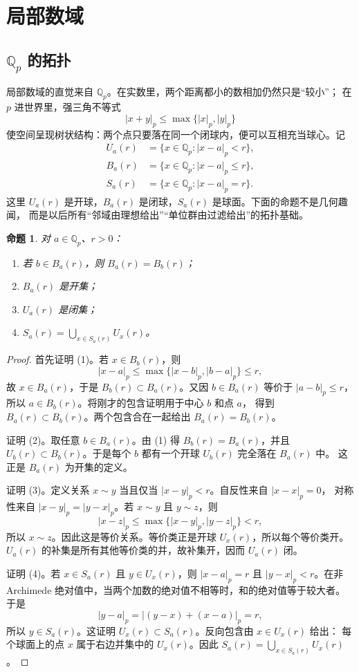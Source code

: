 \documentclass[11pt,a4paper,openany]{ctexbook}
\numberwithin{equation}{chapter}
\newcommand{\Q}{\mathbb{Q}}
\theoremstyle{plain}
\newtheorem{proposition}[theorem]{命题}
\theoremstyle{definition}
\theoremstyle{remark}
\begin{document}
\section{局部数域}

\subsection{\texorpdfstring{$\Q_p$}{Qp} 的拓扑}

局部数域的直觉来自 $\Q_p$。在实数里，两个距离都小的数相加仍然只是“较小”；
在 $p$ 进世界里，强三角不等式
\[
|x+ y|_p\le \max\{|x|_p,|y|_p\}
\]
使空间呈现树状结构：两个点只要落在同一个闭球内，便可以互相充当球心。记
\[
\begin{aligned}
U_a(r)&=\{x\in\Q_p:|x-a|_p<r\},\\
B_a(r)&=\{x\in\Q_p:|x-a|_p\le r\},\\
S_a(r)&=\{x\in\Q_p:|x-a|_p=r\}.
\end{aligned}
\]
这里 $U_a(r)$ 是开球，$B_a(r)$ 是闭球，$S_a(r)$ 是球面。下面的命题不是几何趣闻，
而是以后所有“邻域由理想给出”“单位群由过滤给出”的拓扑基础。

\begin{proposition}
对 $a\in\Q_p$、$r>0$：
\begin{enumerate}[label=(\arabic*)]
\item 若 $b\in B_a(r)$，则 $B_a(r)=B_b(r)$；
\item $B_a(r)$ 是开集；
\item $U_a(r)$ 是闭集；
\item $S_a(r)=\bigcup_{x\in S_a(r)}U_x(r)$。
\end{enumerate}
\end{proposition}

\begin{proof}
首先证明 (1)。若 $x\in B_b(r)$，则
\[
|x-a|_p\le\max\{|x-b|_p,|b-a|_p\}\le r,
\]
故 $x\in B_a(r)$，于是 $B_b(r)\subset B_a(r)$。又因 $b\in B_a(r)$ 等价于
 $|a-b|_p\le r$，所以 $a\in B_b(r)$。将刚才的包含证明用于中心 $b$ 和点 $a$，
得到 $B_a(r)\subset B_b(r)$。两个包含合在一起给出 $B_a(r)=B_b(r)$。

证明 (2)。取任意 $b\in B_a(r)$。由 (1) 得 $B_b(r)=B_a(r)$，并且
$U_b(r)\subset B_b(r)$。于是每个 $b$ 都有一个开球 $U_b(r)$ 完全落在 $B_a(r)$ 中。
这正是 $B_a(r)$ 为开集的定义。

证明 (3)。定义关系 $x\sim y$ 当且仅当 $|x-y|_p<r$。自反性来自 $|x-x|_p=0$，
对称性来自 $|x-y|_p=|y-x|_p$。若 $x\sim y$ 且 $y\sim z$，则
\[
|x-z|_p\le \max\{|x-y|_p,|y-z|_p\}<r,
\]
所以 $x\sim z$。因此这是等价关系。等价类正是开球 $U_x(r)$，所以每个等价类开。
$U_a(r)$ 的补集是所有其他等价类的并，故补集开，因而 $U_a(r)$ 闭。

证明 (4)。若 $x\in S_a(r)$ 且 $y\in U_x(r)$，则 $|x-a|_p=r$ 且 $|y-x|_p<r$。在非
Archimede 绝对值中，当两个加数的绝对值不相等时，和的绝对值等于较大者。于是
\[
|y-a|_p=|(y-x)+(x-a)|_p=r,
\]
所以 $y\in S_a(r)$。这证明 $U_x(r)\subset S_a(r)$。反向包含由 $x\in U_x(r)$ 给出：
每个球面上的点 $x$ 属于右边并集中的 $U_x(r)$。因此
$S_a(r)=\bigcup_{x\in S_a(r)}U_x(r)$。
\end{proof}
\end{document}
